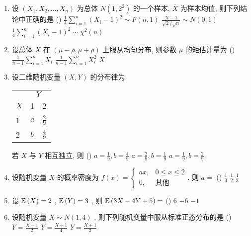 \begin{enumerate}
	\item 设 $(X_1,X_2,\ldots,X_n)$ 为总体 $N\left(1,2^2\right)$ 的一个样本, $\overline X$ 为样本均值, 则下列结论中正确的是 (\hspace{1pc})
	{$\frac{1}{4}\sum_{i=1}^{n}(X_i-1)^2\sim F(n,1)$}
	{$\frac{\overline{X}-1}{\sqrt{2}/\sqrt{n}}\sim N(0,1)$}
	{$\frac{1}{4}\sum_{i=1}^{n}(X_i-1)^2\sim\chi^2(n)$}

	\item 设总体 $X$ 在 $(\mu-\rho,\mu+\rho)$ 上服从均匀分布, 则参数 $\mu$ 的矩估计量为 (\hspace{1pc})
	{$\frac{1}{n-1}\sum_{i=1}^{n}X_i$}
	{$\frac{1}{n-1}\sum_{i=1}^{n}X_i^2$}
	{$\overline{X}$}

	\item 设二维随机变量 $(X,Y)$ 的分布律为:
	\begin{center}
		\begin{tabularx}{0.8\textwidth}{ZZZ}
			\hline
			 & \\
			$X$ & 1 & 2\\
			 & $a$ & $\frac{2}{9}$\\
			 & $b$ & $\frac{4}{9}$\\
			\hline
		\end{tabularx}
	\end{center}
	若 $X$ 与 $Y$ 相互独立, 则 (\hspace{1pc})
	{$a=\frac{1}{9}, b=\frac{4}{9}$}
	{$a=\frac{2}{9}, b=\frac{1}{9}$}
	{$a=\frac{1}{9}, b=\frac{2}{9}$}

	\item 设随机变量 $X$ 的概率密度为 $f(x)=
	\begin{cases}
	ax, & 0\leq x\leq 2\\
	0, & \text{其他}
	\end{cases}
	$, 则 $a=$ (\hspace{1pc})
	{$\frac{1}{4}$}
	{$\frac{1}{2}$}
	{$\frac{1}{3}$}

	\item 设 $\mathbb{E}\,(X)=2$ , $\mathbb{E}\,(Y)=3$ , 则 $\mathbb{E}\,(3X-4Y+5)=$ (\hspace{1pc})
	{6}
	{$-6$}
	{$-1$}

	\item 设随机变量 $X\sim N(1,4)$ , 则下列随机变量中服从标准正态分布的是 (\hspace{1pc})
	{$Y=\frac{X-1}{2}$}
	{$Y=\frac{X+1}{4}$}
	{$Y=\frac{X+1}{2}$}


\end{enumerate}
